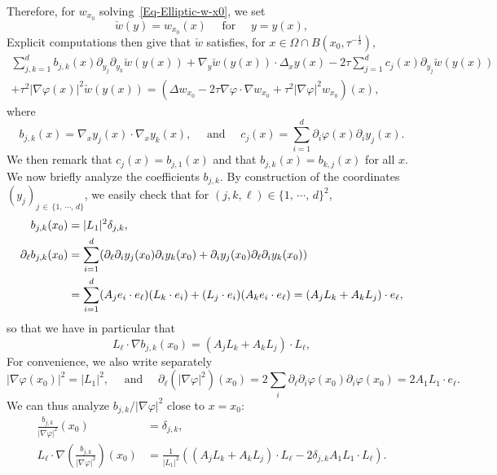 \documentclass[AHL,Unicode,longabstracts]{cedram}
\begin{document}
Therefore, for $w_{x_0}$ solving~\eqref{Eq-Elliptic-w-x0}, we set
\begin{equation*}
\check w(y) = w_{x_0}(x) \quad \text{ for } \quad y = y(x),
\end{equation*}
Explicit computations then give that $\check w$ satisfies, for $x \in \Omega \cap B(x_0, \tau^{-\frac{1}{3}}), $
\begin{multline}\label{Eq-Tilde-w}
 \sum_{j,k = 1}^d b_{j,k}(x) \partial_{y_j} \partial_{y_k} \check w(y(x)) + \nabla_y \check w(y(x)) \cdot \Delta_x y(x) - 2 \tau \sum_{j = 1}^d c_j (x) \partial_{y_j} \check w(y(x))
\\
+
\tau^2 |\nabla \varphi(x)|^2 \check w (y(x)) =
\left(\Delta w_{x_0} - 2\tau \nabla \varphi \cdot \nabla w_{x_0} + \tau^2 |\nabla \varphi|^2 w_{x_0} \right)(x),
\end{multline}
where
\[
b_{j,k}(x) = \nabla_x y_j(x) \cdot \nabla_x y_k(x), \quad \text{ and } \quad c_j (x) = \sum_{i = 1}^d \partial_i \varphi(x) \partial_i y_j(x).
\]
We then remark that $c_j(x) = b_{j,1}(x)$ and that $b_{j,k}(x) = b_{k,j}(x)$ for all $x$. We now briefly analyze the coefficients $b_{j,k}$. By construction of the coordinates $(y_j)_{j \,\in\,\{1,\, \cdots,\, d\}}$, we easily check that for $(j,k,\ell) \in \{1,\, \cdots,\, d\}^2$,
\begin{align*}
b_{j,k}(x_0) &= |L_1|^2 \delta_{j,k},
\\
\partial_\ell b_{j,k} (x_0) & = \sum_{i = 1}^d (\partial_\ell \partial_i y_j (x_0) \partial_i y_k(x_0) + \partial_i y_j(x_0) \partial_\ell \partial_i y_k(x_0))
\notag
\\
& = \sum_{i = 1}^d (A_j e_i \cdot e_\ell) (L_k \cdot e_i)+ (L_j \cdot e_i) (A_k e_i \cdot e_\ell) = \left(A_j L_k + A_k L_j\right) \cdot e_\ell,
\end{align*}
so that we have in particular that
\[
L_\ell \cdot \nabla b_{j,k} (x_0)= \left(A_j L_k + A_k L_j\right) \cdot L_\ell,
\]
For convenience, we also write separately
\[
|\nabla \varphi(x_0)|^2 = |L_1|^2,
\quad
\text{ and }
\quad
\partial_\ell \left(|\nabla \varphi|^2\right)(x_0) = 2 \sum_{i} \partial_\ell \partial_i \varphi(x_0) \partial_i \varphi(x_0) = 2 A_1 L_1 \cdot e_\ell.
\]
We can thus analyze $b_{j,k} / |\nabla \varphi|^2$ close to $x = x_0$:
\begin{align*}
\frac{b_{j,k}}{|\nabla \varphi|^2} (x_0) & = \delta_{j,k},
\\
L_\ell \cdot \nabla \left(\frac{b_{j,k}}{|\nabla \varphi|^2} \right) (x_0) & =
\frac{1}{|L_1|^2} \left(\left(A_j L_k + A_k L_j\right) \cdot L_\ell -2 \delta_{j,k} A_1 L_1 \cdot L_\ell \right).
\end{align*}
\end{document}
